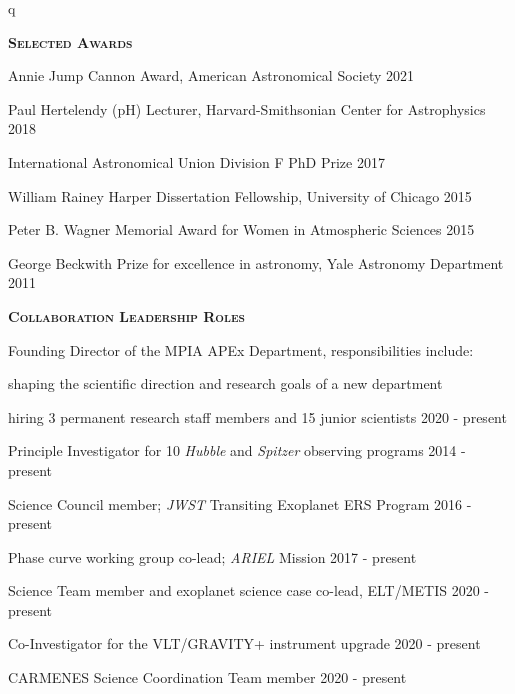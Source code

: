 q\documentclass[12pt,letterpaper]{article}
\begin{document}
\textbf{\textsc{Selected Awards}}
\begin{compactitem}[]
\item Annie Jump Cannon Award, American Astronomical Society \hfill 2021
\item Paul Hertelendy (pH) Lecturer, Harvard-Smithsonian Center for Astrophysics \hfill 2018 
\item International Astronomical Union Division F PhD Prize \hfill 2017
\item William Rainey Harper Dissertation Fellowship, University of Chicago \hfill 2015
\item Peter B. Wagner Memorial Award for Women in Atmospheric Sciences \hfill 2015
\item George Beckwith Prize for excellence in astronomy, Yale Astronomy Department \hfill2011
\end{compactitem}
\vspace{6mm}


\textbf{\textsc{Collaboration Leadership Roles}}
\begin{compactitem}[]
\item Founding Director of the MPIA APEx Department, responsibilities include:
    \begin{sloppypar}
        \begin{compactitem}
        \item shaping the scientific direction and research goals of a new department
        \item hiring 3 permanent research staff members and 15 junior scientists \hfill 2020 - present
        \end{compactitem}
    \end{sloppypar}
\item Principle Investigator for 10 \emph{Hubble} and \emph{Spitzer} observing programs \hfill 2014 - present
\item Science Council member; \emph{JWST} Transiting Exoplanet ERS Program \hfill 2016 - present
\item Phase curve working group co-lead; \emph{ARIEL} Mission \hfill 2017 - present
\item Science Team member and exoplanet science case co-lead, ELT/METIS \hfill 2020 - present
\item Co-Investigator for the VLT/GRAVITY+ instrument upgrade \hfill 2020 - present
\item CARMENES Science Coordination Team member \hfill 2020 - present
\end{compactitem}
\vspace{6mm}
\end{document}
